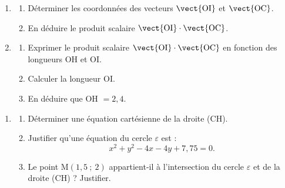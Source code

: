 \begin{enumerate}
\item 
	\begin{enumerate}
	\item Déterminer les coordonnées des vecteurs $\vect{\text{OI}}$ et $\vect{\text{OC}}$.
	\item En déduire le produit scalaire $\vect{\text{OI}} \cdot \vect{\text{OC}}$.
	\end{enumerate}

\bigskip

\item 
	\begin{enumerate}
	\item Exprimer le produit scalaire $\vect{\text{OI}} \cdot \vect{\text{OC}}$ en fonction des longueurs OH et OI.
	\item Calculer la longueur OI.
	\item En déduire que OH $= 2,4$.
	\end{enumerate}
\end{enumerate}

\begin{center}
\begin{minipage}{0.75\textwidth}
\begin{enumerate}[start=3]
\item 
	\begin{enumerate}
	\item Déterminer une équation cartésienne de la droite (CH).
	\item Justifier qu'une équation du cercle $\varepsilon$ est :
\[x^2 + y^2 - 4x - 4y + 7,75 = 0.\]
	\item Le point M$(1,5~;~2)$ appartient-il à l'intersection du cercle $\varepsilon$ et de la droite (CH) ? Justifier.
	\end{enumerate}
\end{enumerate}
\end{minipage}
\hfill
{}
\end{center}
